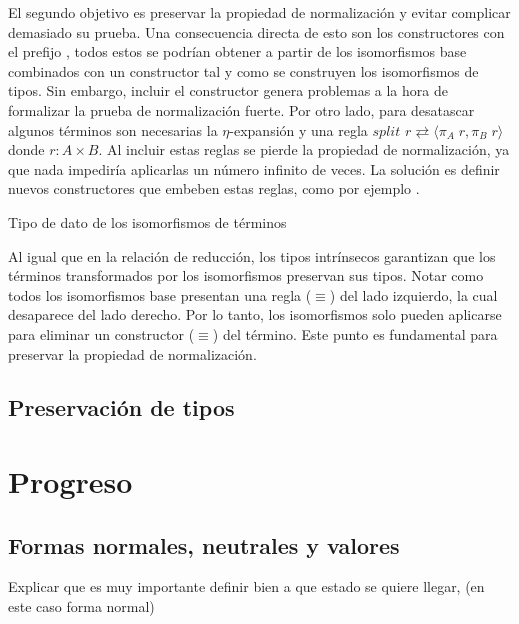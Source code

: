\documentclass[]{report}
\begin{document}
	El segundo objetivo es preservar la propiedad de normalización y evitar complicar demasiado su prueba.
	Una consecuencia directa de esto son los constructores con el prefijo , todos estos se podrían obtener a partir de los isomorfismos base combinados con un constructor  tal y como se construyen los isomorfismos de tipos.
	Sin embargo, incluir el constructor  genera problemas a la hora de formalizar la prueba de normalización fuerte.
	Por otro lado, para desatascar algunos términos son necesarias la $\eta$-expansión y una regla $split$ $r \rightleftarrows \langle \pi_A\; r , \pi_B\; r \rangle$ donde $r: A \times B$.
	Al incluir estas reglas se pierde la propiedad de normalización, ya que nada impediría aplicarlas un número infinito de veces.
	La solución es definir nuevos constructores que embeben estas reglas, como por ejemplo .
	
	
	\begin{codigo}
		Tipo de dato de los isomorfismos de términos
		
	\end{codigo}
	
	Al igual que en la relación de reducción, los tipos intrínsecos garantizan que los términos transformados por los isomorfismos preservan sus tipos.
	Notar como todos los isomorfismos base presentan una regla ($\equiv$) del lado izquierdo, la cual desaparece del lado derecho.
	Por lo tanto, los isomorfismos solo pueden aplicarse para eliminar un constructor ($\equiv$) del término.
	Este punto es fundamental para preservar la propiedad de normalización.
	
	
	\subsection{Preservación de tipos}
	
	\section{Progreso}
	
	\subsection{Formas normales, neutrales y valores}
	Explicar que es muy importante definir bien a que estado se quiere llegar, (en este caso forma normal)
	
\end{document}
